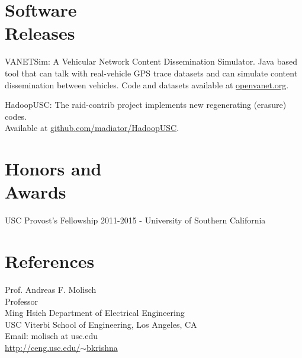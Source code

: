\documentclass[margin,line]{resume}
\begin{document}
\begin{resume}
\section{\mysidestyle Software \\ Releases}
\begin{list2}
\item VANETSim: A Vehicular Network Content Dissemination Simulator. Java based tool that can talk with real-vehicle GPS trace datasets and can simulate content dissemination between vehicles. Code and datasets available at \href{http://www.openvanet.org}{openvanet.org}.
\item HadoopUSC: The raid-contrib project implements new regenerating (erasure) codes. \\Available at \href{https://github.com/madiator/HadoopUSC}{github.com/madiator/HadoopUSC}.
\end{list2}


    
\section{\mysidestyle Honors and\\Awards} 
\begin{list2}
	  \item USC Provost's Fellowship 2011-2015	- University of Southern California
\end{list2}
  

\section{\mysidestyle References} 
Prof. Andreas F. Molisch \\
Professor \\
Ming Hsieh Department of Electrical Engineering \\
USC Viterbi School of Engineering, Los Angeles, CA \\
Email: molisch at usc.edu \\
\href{http://ceng.usc.edu/~bkrishna}{http://ceng.usc.edu/$\sim$bkrishna}

\end{resume}
\end{document}
